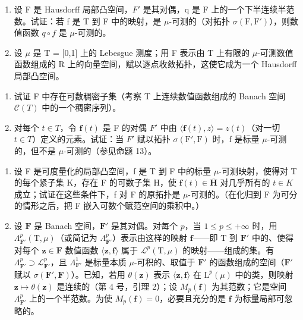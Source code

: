 \begin{enumerate}
\def\labelenumi{\arabic{enumi})}
\setcounter{enumi}{12}
\item
  设 F 是 Hausdorff 局部凸空间，\(F'\) 是其对偶，q 是 F 上的一个下半连续半范数。试证：若 f 是 T 到 F 中的映射，是 \(\mu\)-可测的（对拓扑 \(\sigma(\mathrm{F},\mathrm{F}')\)），则数值函数 \(q \circ f\) 是 \(\mu\)-可测的。
\item
  设 \(\mu\) 是 T = {[}0,1{]} 上的 Lebesgue 测度；用 F 表示由 T 上有限的 \(\mu\)-可测数值函数组成的 R 上的向量空间，赋以逐点收敛拓扑，这使它成为一个 Hausdorff 局部凸空间。
\end{enumerate}

\begin{enumerate}
\def\labelenumi{\alph{enumi})}
\item
  试证 F 中存在可数稠密子集（考察 T 上连续数值函数组成的 Banach 空间 \(\mathcal{C}(T)\) 中的一个稠密序列）。
\item
  对每个 \(t \in T\)，令 \(\mathbf{f}(t)\) 是 F 的对偶 \(F'\) 中由 \(\langle\mathbf{f}(t), z\rangle = z(t)\)（对一切 \(t \in T\)）定义的元素。试证：当 \(F'\) 赋以拓扑 \(\sigma(\mathrm{F}', \mathrm{F})\) 时，f 是标量 \(\mu\)-可测的，但不是 \(\mu\)-可测的（参见命题 13）。
\end{enumerate}

\begin{enumerate}
\def\labelenumi{\arabic{enumi})}
\setcounter{enumi}{14}
\item
  设 F 是可度量化的局部凸空间，f 是 T 到 F 中的标量 \(\mu\)-可测映射，使得对 T 的每个紧子集 K，存在 F 的可数子集 H，使 \(\mathbf{f}(t) \in \overline{\mathbf{H}}\) 对几乎所有的 \(t \in K\) 成立；试证在这些条件下，f 对 F 的原拓扑是 \(\mu\)-可测的。（在化归到 F 为可分的情形之后，把 F 嵌入可数个赋范空间的乘积中。）
\item
  设 \(\mathbf{F}\) 是 Banach 空间，\(\mathbf{F}'\) 是其对偶。对每个 \(p\)，当 \(1 \leqslant p \leqslant +\infty\) 时，用 \(\Lambda_{\mathbf{F}'}^p(\mathrm{T},\mu)\)（或简记为 \(\Lambda_{\mathbf{F}'}^p\)）表示由这样的映射 \(\mathbf{f}\)——即 \(\mathrm{T}\) 到 \(\mathbf{F}'\) 中的、使得对每个 \(\mathbf{z} \in \mathbf{F}\) 数值函数 \(\langle \mathbf{z},\mathbf{f}\rangle\) 属于 \(\mathcal{L}^p(\mathrm{T},\mu)\) 的映射——组成的集。有 \(\Lambda_{\mathbf{F}'}^p \supset \mathcal{L}_{\mathbf{F}'}^p\)，且 \(\Lambda_{\mathbf{F}'}^1\) 是标量本质 \(\mu\)-可积的、取值于 \(\mathbf{F}'\) 的函数组成的空间（\(\mathbf{F}'\) 赋以 \(\sigma(\mathbf{F}',\mathbf{F})\)）。已知，若用 \(\theta(\mathbf{z})\) 表示 \(\langle \mathbf{z},\mathbf{f}\rangle\) 在 \(\mathrm{L}^p(\mu)\) 中的类，则映射 \(\mathbf{z} \mapsto \theta(\mathbf{z})\) 是连续的（第 4 号，引理 2）；设 \(M_p(\mathbf{f})\) 为其范数；它是空间 \(\Lambda_{\mathbf{F}'}^p\) 上的一个半范数。为使 \(M_p(\mathbf{f}) = 0\)，必要且充分的是 \(\mathbf{f}\) 为标量局部可忽略的。
\end{enumerate}


